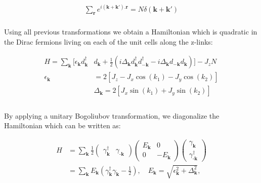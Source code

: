 \documentclass{article}
\begin{document}
\begin{equation}\label{eq:15}
	\begin{aligned}
		\sum_\textbf{r} e^{i(\textbf{k}+\textbf{k}').\textbf{r}} = N\delta(\textbf{k} + \textbf{k}')
	\end{aligned}
\end{equation}\\

Using all previous transformations we obtain a Hamiltonian which is quadratic in the Dirac fermions living on each of the unit cells along the z-links:

\begin{equation}\label{eq:16}
	\begin{aligned}
		H = \sum_\textbf{k}[\epsilon_\textbf{k}d^\dagger_{\textbf{k}}&d_{\textbf{k}} + \frac{1}{2}(i\Delta_\textbf{k}d^\dagger_{\textbf{k}}d^\dagger_{-\textbf{k}}-i\Delta_\textbf{k}d_{-\textbf{k}}d_{\textbf{k}})]-J_zN\\
		\epsilon_\textbf{k} &= 2[J_z-J_x\cos(k_1)-J_y\cos(k_2)]\\
		&\Delta_\textbf{k} = 2[J_x\sin(k_1)+J_y\sin(k_2)]\\
	\end{aligned}
\end{equation}\\

\noindent By applying a unitary Bogoliubov transformation, we diagonalize the Hamiltonian which can be written as:

\begin{equation}\label{eq:17}
	\begin{aligned}
		H &= \sum_\textbf{k} \frac{1}{2} 
		\begin{pmatrix}
			\gamma^\dagger_\textbf{k} & \gamma_{\textbf{-k}}
		\end{pmatrix}
		\begin{pmatrix}
			E_\textbf{k} & 0\\
			0 & -E_\textbf{k}
		\end{pmatrix}
		\begin{pmatrix} \gamma_\textbf{k} \\ \gamma^\dagger_{\textbf{-k}} \end{pmatrix}\\
		&= \sum_\textbf{k}E_\textbf{k}(\gamma^\dagger_\textbf{k}\gamma_{\textbf{k}}-\frac{1}{2}), \quad E_{\mathbf{k}} = \sqrt{\epsilon_{\mathbf{k}}^2 + \Delta_{\mathbf{k}}^2},
	\end{aligned}
\end{equation}\\
\end{document}
